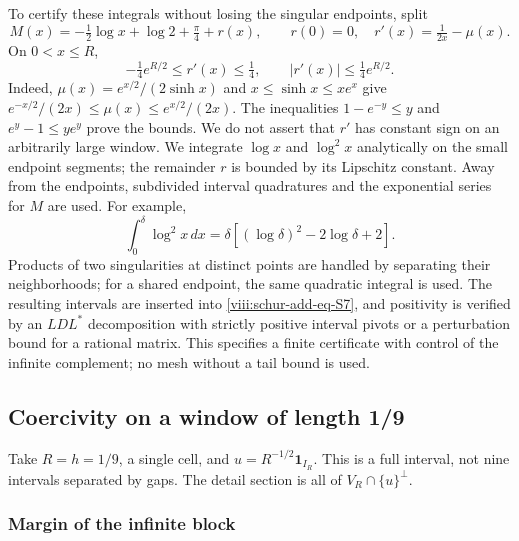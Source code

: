 To certify these integrals without losing the singular endpoints,
split
\begin{equation}
M(x)=-\tfrac12\log x+\log2+\tfrac\pi4+r(x),
\qquad r(0)=0,\quad r'(x)=\tfrac1{2x}-\mu(x).
\label{viii:schur-add-eq-S8}
\end{equation}
On \(0<x\leq R\),
\begin{equation}
-\tfrac14 e^{R/2}\leq r'(x)\leq\tfrac14,
\qquad |r'(x)|\leq\tfrac14e^{R/2}.
\label{viii:schur-add-display-19}
\end{equation}
Indeed, \(\mu(x)=e^{x/2}/(2\sinh x)\) and
\(x\leq\sinh x\leq xe^x\) give
\(e^{-x/2}/(2x)\leq\mu(x)\leq e^{x/2}/(2x)\).
The inequalities \(1-e^{-y}\leq y\) and \(e^y-1\leq ye^y\)
prove the bounds. We do not assert that \(r'\) has constant sign
on an arbitrarily large window.
We integrate \(\log x\) and \(\log^2x\) analytically on the small
endpoint segments; the remainder \(r\) is bounded by its Lipschitz constant.
Away from the endpoints, subdivided interval quadratures and
the exponential series for \(M\) are used. For example,
\begin{equation}
\int_0^\delta\log^2x\,dx
=\delta[(\log\delta)^2-2\log\delta+2].
\label{viii:schur-add-display-20}
\end{equation}
Products of two singularities at distinct points are handled
by separating their neighborhoods; for a shared endpoint, the same
quadratic integral is used. The resulting intervals are inserted into \eqref{viii:schur-add-eq-S7}, and
positivity is verified by an \(LDL^*\) decomposition with
strictly positive interval pivots or a perturbation bound
for a rational matrix. This specifies a finite certificate
with control of the infinite complement; no mesh without a tail bound is used.

\subsection{Coercivity on a window of length 1/9}
\label{viii:schur-add-sub-248}

Take \(R=h=1/9\), a single cell, and \(u=R^{-1/2}\mathbf1_{I_R}\).
This is a full interval, not nine intervals separated by gaps. The detail
section is all of \(V_R\cap\{u\}^{\perp}\).

\subsubsection{Margin of the infinite block}
\label{viii:schur-add-sub-254}

